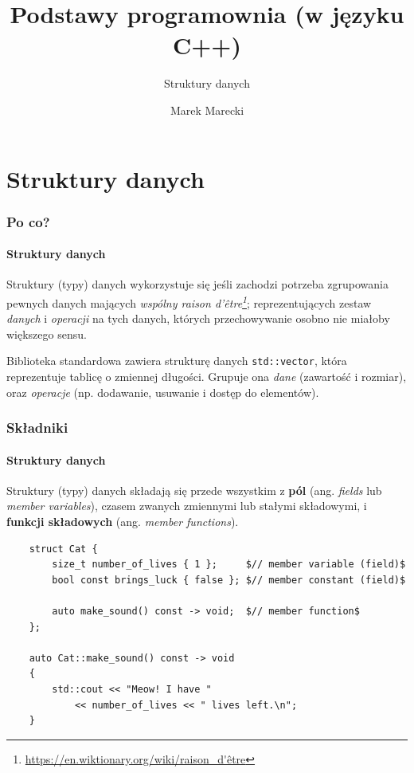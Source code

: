 \documentclass[aspectratio=169,10pt]{beamer}
\title{Podstawy programownia (w języku C++)}
\subtitle{Struktury danych}
\author{Marek Marecki}
\institute{Polsko-Japońska Akademia Technik Komputerowych}
\begin{document}
{%
    \frame{\titlepage}
}

\section{Struktury danych}

\begin{frame}
    \frametitle{Po co?}
    \framesubtitle{Struktury danych}

    Struktury (typy) danych wykorzystuje się jeśli zachodzi potrzeba zgrupowania
    pewnych danych mających \emph{wspólny raison
    d'être\footnote{\url{https://en.wiktionary.org/wiki/raison_d'être}}};
    reprezentujących zestaw \emph{danych} i \emph{operacji} na tych danych,
    których przechowywanie osobno nie miałoby większego sensu.

    \vspace{1em}

    Biblioteka standardowa zawiera strukturę danych {\tt std::vector}, która
    reprezentuje tablicę o zmiennej długości. Grupuje ona \emph{dane} (zawartość
    i rozmiar), oraz \emph{operacje} (np. dodawanie, usuwanie i dostęp do
    elementów).
\end{frame}

\begin{frame}[fragile]
    \frametitle{Składniki}
    \framesubtitle{Struktury danych}

    Struktury (typy) danych składają się przede wszystkim z \textbf{pól} (ang.
    \emph{fields} lub \emph{member variables}), czasem zwanych zmiennymi lub
    stałymi składowymi, i \textbf{funkcji składowych} (ang. \emph{member
    functions}).

    {\scriptsize
    \begin{lstlisting}
    struct Cat {
        size_t number_of_lives { 1 };     $// member variable (field)$
        bool const brings_luck { false }; $// member constant (field)$

        auto make_sound() const -> void;  $// member function$
    };

    auto Cat::make_sound() const -> void
    {
        std::cout << "Meow! I have "
            << number_of_lives << " lives left.\n";
    }
    \end{lstlisting}}
\end{frame}
\end{document}
